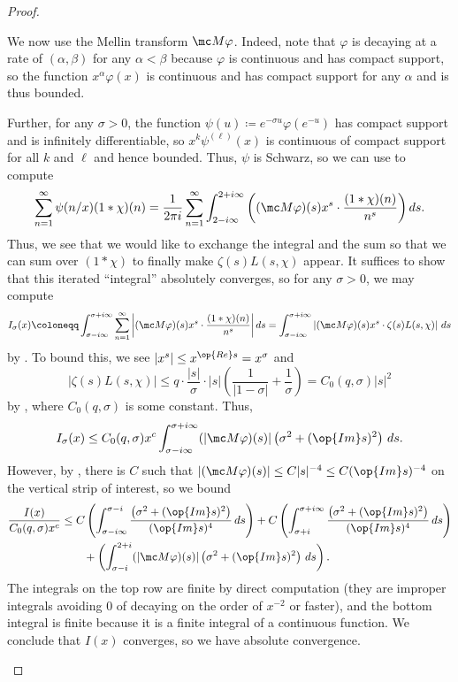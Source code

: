 \documentclass[../notes.tex]{subfiles}
\begin{document}
\begin{proof}
\begin{enumerate}
		We now use the Mellin transform $\mc M\varphi$. Indeed, note that $\varphi$ is decaying at a rate of $(\alpha,\beta)$ for any $\alpha<\beta$ because $\varphi$ is continuous and has compact support, so the function $x^\alpha\varphi(x)$ is continuous and has compact support for any $\alpha$ and is thus bounded.
		
		Further, for any $\sigma>0$, the function $\psi(u)\coloneqq e^{-\sigma u}\varphi\left(e^{-u}\right)$ has compact support and is infinitely differentiable, so $x^k\psi^{(\ell)}(x)$ is continuous of compact support for all $k$ and $\ell$ and hence bounded. Thus, $\psi$ is Schwarz, so we can use  to compute
		\[\sum_{n=1}^\infty\psi(n/x)(1*\chi)(n)=\frac1{2\pi i}\sum_{n=1}^\infty\int_{2-i\infty}^{2+i\infty}\left((\mc M\varphi)(s)x^{s}\cdot\frac{(1*\chi)(n)}{n^s}\right)ds.\]
		Thus, we see that we would like to exchange the integral and the sum so that we can sum over $(1*\chi)$ to finally make $\zeta(s)L(s,\chi)$ appear. It suffices to show that this iterated ``integral'' absolutely converges, so for any $\sigma>0$, we may compute
		\[I_\sigma(x)\coloneqq\int_{\sigma-i\infty}^{\sigma+i\infty}\sum_{n=1}^\infty\left|(\mc M\varphi)(s)x^{s}\cdot\frac{(1*\chi)(n)}{n^s}\right|ds=\int_{\sigma-i\infty}^{\sigma+i\infty}\left|(\mc M\varphi)(s)x^s\cdot\zeta(s)L(s,\chi)\right|\,ds\]
		by . To bound this, we see $\left|x^s\right|\le x^{\op{Re}s}=x^\sigma$ and
		\[|\zeta(s)L(s,\chi)|\le q\cdot\frac{|s|}\sigma\cdot|s|\left(\frac1{|1-\sigma|}+\frac1\sigma\right)=C_0(q,\sigma)|s|^2\]
		by , where $C_0(q,\sigma)$ is some constant. Thus,
		\[I_\sigma(x)\le C_0(q,\sigma)x^c\int_{\sigma-i\infty}^{\sigma+i\infty}(|\mc M\varphi)(s)|\left(\sigma^2+(\op{Im}s)^2\right)\,ds.\]
		However, by , there is $C$ such that $|(\mc M\varphi)(s)|\le C|s|^{-4}\le C(\op{Im}s)^{-4}$ on the vertical strip of interest, so we bound
		\begin{align*}
			\frac{I(x)}{C_0(q,\sigma)x^c} &\le 
			C\left(\int_{\sigma-i\infty}^{\sigma-i}\frac{\left(\sigma^2+(\op{Im}s)^2\right)}{(\op{Im}s)^4}\,ds\right)
			+C\left(\int_{\sigma+i}^{\sigma+i\infty}\frac{\left(\sigma^2+(\op{Im}s)^2\right)}{(\op{Im}s)^4}\,ds\right) \\
			&\qquad+\left(\int_{\sigma-i}^{2+i}(|\mc M\varphi)(s)|\left(\sigma^2+(\op{Im}s)^2\right)\,ds\right).
		\end{align*}
		The integrals on the top row are finite by direct computation (they are improper integrals avoiding $0$ of decaying on the order of $x^{-2}$ or faster), and the bottom integral is finite because it is a finite integral of a continuous function. We conclude that $I(x)$ converges, so we have absolute convergence.
		

\end{enumerate}
\end{proof}
\end{document}
